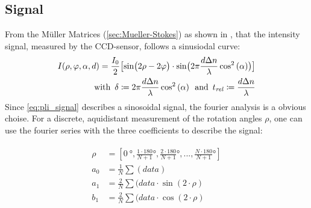 \subsection{Signal}
% 
From the M\"{u}ller Matrices (\cref{sec:Mueller-Stokes}) as shown in \cite{MenzelMaster,MenzelDissertation}, that the intensity signal, measured by the \ac{CCD}-sensor, follows a sinusiodal curve:
% 
\begin{align}
\label{eq:pli_signal}
\begin{split}
I(\rho, \varphi, \alpha, d) =\frac{I_0}{2}\bigl[ \sin\bigl(2\rho - 2\varphi \bigr)\cdot \sin \bigl( 2\pi\frac{d \textnormal{$\Delta n$}}{\lambda} \cos^2\left( \alpha \right) \bigr) \bigr] \\
\text{with} \enspace \delta \coloneqq 2\pi\frac{d \textnormal{$\Delta n$}}{\lambda} \cos^2\left( \alpha \right) \enspace 
\text{and} \enspace \textnormal{$t_\mathit{rel}$} \coloneqq \frac{d \textnormal{$\Delta n$}}{\lambda}
\end{split}
\end{align}
% 
Since \cref{eq:pli_signal} describes a sinosoidal signal, the fourier analysis is a obvious choise.
For a discrete, aquidistant measurement of the rotation angles $\rho$, one can use the fourier series with the three coefficients to describe the signal:
% 

\begin{align}
\begin{split}
\rho &= [\SI{0}{\degree}, \frac{1\cdot180}{N+1}\si{\degree}, \frac{2\cdot180}{N+1}\si{\degree}, ..., \frac{N\cdot180}{N+1}\si{\degree}]\\
a_0 &= \frac{1}{N} \sum(\mathit{data})\\
a_1 &= \frac{2}{N} \sum(\mathit{data} \cdot \sin(2 \cdot \rho)\\
b_1 &= \frac{2}{N} \sum(\mathit{data} \cdot \cos(2 \cdot \rho)
\end{split}
\end{align}

